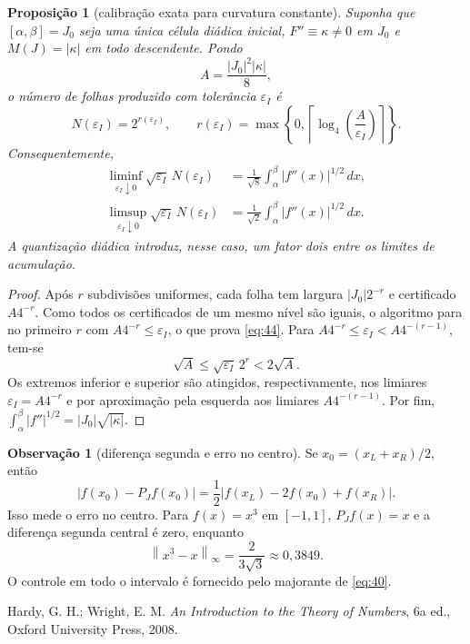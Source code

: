 \documentclass[11pt,a4paper]{article}
\theoremstyle{preciso}
\newtheorem{proposicao}[teorema]{Proposição}
\theoremstyle{definition}
\newtheorem{observacao}[teorema]{Observação}
\newcommand{\norm}[1]{\left\|#1\right\|_{\infty}}
\newcommand{\eqn}[2]{\begin{equation}\label{eq:#1}#2\end{equation}}
\begin{document}
\begin{proposicao}[calibração exata para curvatura constante]
Suponha que $[\alpha,\beta]=J_0$ seja uma única célula diádica inicial, $F''\equiv\kappa\ne0$ em $J_0$ e $M(J)=|\kappa|$ em todo descendente. Pondo
\[
A=\frac{|J_0|^2|\kappa|}8,
\]
o número de folhas produzido com tolerância $\varepsilon_I$ é
\eqn{44}{N(\varepsilon_I)=2^{r(\varepsilon_I)},\qquad
r(\varepsilon_I)=\max\left\{0,\left\lceil\log_4\left(\frac A{\varepsilon_I}\right)\right\rceil\right\}.}
Consequentemente,
\eqn{45}{\begin{aligned}
\liminf_{\varepsilon_I\downarrow0}\sqrt{\varepsilon_I}\,N(\varepsilon_I)
&=\frac1{\sqrt8}\int_\alpha^\beta|f''(x)|^{1/2}\,dx,\\
\limsup_{\varepsilon_I\downarrow0}\sqrt{\varepsilon_I}\,N(\varepsilon_I)
&=\frac1{\sqrt2}\int_\alpha^\beta|f''(x)|^{1/2}\,dx.
\end{aligned}}
A quantização diádica introduz, nesse caso, um fator dois entre os limites de acumulação.
\end{proposicao}
\begin{proof}
Após $r$ subdivisões uniformes, cada folha tem largura $|J_0|2^{-r}$ e certificado $A4^{-r}$. Como todos os certificados de um mesmo nível são iguais, o algoritmo para no primeiro $r$ com $A4^{-r}\le\varepsilon_I$, o que prova \eqref{eq:44}. Para $A4^{-r}\le\varepsilon_I<A4^{-(r-1)}$, tem-se
\[
\sqrt A\le\sqrt{\varepsilon_I}\,2^r<2\sqrt A.
\]
Os extremos inferior e superior são atingidos, respectivamente, nos limiares $\varepsilon_I=A4^{-r}$ e por aproximação pela esquerda aos limiares $A4^{-(r-1)}$. Por fim, $\int_\alpha^\beta|f''|^{1/2}=|J_0|\sqrt{|\kappa|}$.
\end{proof}

\begin{observacao}[diferença segunda e erro no centro]
Se $x_0=(x_L+x_R)/2$, então
\[
|f(x_0)-P_Jf(x_0)|=\frac12|f(x_L)-2f(x_0)+f(x_R)|.
\]
Isso mede o erro no centro. Para $f(x)=x^3$ em $[-1,1]$, $P_Jf(x)=x$ e a diferença segunda central é zero, enquanto
\[
\norm{x^3-x}=\frac2{3\sqrt3}\approx0{,}3849.
\]
O controle em todo o intervalo é fornecido pelo majorante de \eqref{eq:40}.
\end{observacao}

\begin{thebibliography}{1}
 Hardy, G. H.; Wright, E. M. \emph{An Introduction to the Theory of Numbers}, 6a ed., Oxford University Press, 2008.
\end{thebibliography}
\end{document}

